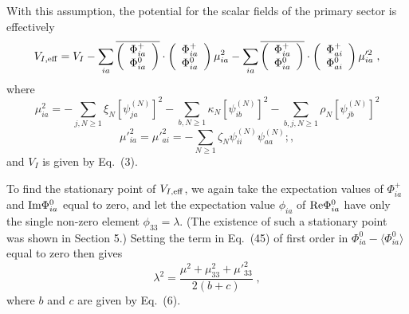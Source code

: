 \documentclass[12pt]{article}
\begin{document}
With this assumption, the potential for the scalar fields of the primary sector is effectively
\begin{equation}
V_{I, {\rm eff}}=V_I - \sum_{ia}\overline{\left(\begin{array}{c}\Phi_{ia}^+ \\ \Phi_{ia}^0\end{array}\right)}\cdot \left(\begin{array}{c}\Phi_{ia}^+ \\ \Phi_{ia}^0\end{array}\right)\mu_{ia}^2-\sum_{ia}\overline{\left(\begin{array}{c}\Phi_{ia}^+ \\ \Phi_{ia}^0\end{array}\right)}\cdot \left(\begin{array}{c}\Phi_{ai}^+ \\ \Phi_{ai}^0\end{array}\right)\mu'^2_{ia}\;,
\end{equation}
where 
\begin{equation}
\mu^2_{ia}=-\sum_{j,N\geq 1}\xi_N[\psi^{(N)}_{ja}]^2-\sum_{b,N\geq 1}\kappa_N[\psi^{(N)}_{ib}]^2-\sum_{b,j,N\geq 1}\rho_N[\psi^{(N)}_{jb}]^2
\end{equation}
\begin{equation}
\mu'^2_{ia}=\mu'^2_{ai}=-\sum_{N\geq 1}\zeta_N\psi^{(N)}_{ii}\psi^{(N)}_{aa};,
\end{equation}
and $V_I$ is given by Eq.~(3).

To find the stationary point of 
$V_{I, {\rm eff}}$, we again take the expectation values of $ \Phi^+_{ia} $ and  $ {\rm Im}\Phi^0_{ia}$ equal to zero, and let the expectation value $\phi_{ia}$ of    ${\rm Re}\Phi^0_{ia} $ have only the single non-zero element $\phi_{33}=\lambda$.  
(The existence of such a stationary point was shown in Section 5.)  Setting the term in Eq.~(45) of first order in $\Phi_{ia}^0-\langle \Phi_{ia}^0\rangle$ equal to zero then gives
\begin{equation}
\lambda^2=\frac{\mu^2+\mu_{33}^2+\mu'^2_{33}}{2(b+c)}\;,
\end{equation}
where $b$ and $c$ are given by Eq.~(6).  
\end{document}
